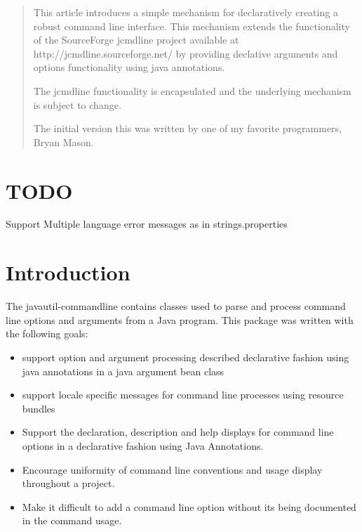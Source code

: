 \documentclass[a4paper,10pt]{article}
\title{}
\author{jim.schmidt@dbexperts.com}
\begin{document}
\maketitle

\begin{abstract}
This article introduces a simple mechanism for declaratively creating a robust command line interface.
This mechanism extends the functionality of the SourceForge jcmdline project available at http://jcmdline.sourceforge.net/
by providing declative arguments and options functionality using java annotations.

The jcmdline functionality is encapsulated and the underlying mechanism is subject to change.

The initial version this was written by one of my favorite programmers, Bryan Mason.
\end{abstract}

\section{TODO}
Support Multiple language error messages as in strings.properties

\section{Introduction}


The javautil-commandline contains classes used to parse and process command line options and arguments from a Java program. This package was written with the following goals:
\begin{itemize}
   \item support option and argument processing described declarative fashion using java annotations in a java argument bean class
   \item support locale specific messages for command line processes using resource bundles 
   \item Support the declaration, description and help displays for command line options in a declarative fashion using Java Annotations.
   \item Encourage uniformity of command line conventions and usage display throughout a project.
   \item Make it difficult to add a command line option without its being documented in the command usage.
\end{itemize}
\end{document}
